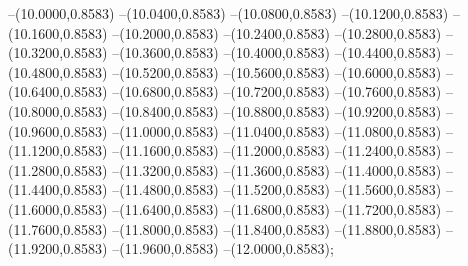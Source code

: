 {	--(10.0000,0.8583)
	--(10.0400,0.8583)
	--(10.0800,0.8583)
	--(10.1200,0.8583)
	--(10.1600,0.8583)
	--(10.2000,0.8583)
	--(10.2400,0.8583)
	--(10.2800,0.8583)
	--(10.3200,0.8583)
	--(10.3600,0.8583)
	--(10.4000,0.8583)
	--(10.4400,0.8583)
	--(10.4800,0.8583)
	--(10.5200,0.8583)
	--(10.5600,0.8583)
	--(10.6000,0.8583)
	--(10.6400,0.8583)
	--(10.6800,0.8583)
	--(10.7200,0.8583)
	--(10.7600,0.8583)
	--(10.8000,0.8583)
	--(10.8400,0.8583)
	--(10.8800,0.8583)
	--(10.9200,0.8583)
	--(10.9600,0.8583)
	--(11.0000,0.8583)
	--(11.0400,0.8583)
	--(11.0800,0.8583)
	--(11.1200,0.8583)
	--(11.1600,0.8583)
	--(11.2000,0.8583)
	--(11.2400,0.8583)
	--(11.2800,0.8583)
	--(11.3200,0.8583)
	--(11.3600,0.8583)
	--(11.4000,0.8583)
	--(11.4400,0.8583)
	--(11.4800,0.8583)
	--(11.5200,0.8583)
	--(11.5600,0.8583)
	--(11.6000,0.8583)
	--(11.6400,0.8583)
	--(11.6800,0.8583)
	--(11.7200,0.8583)
	--(11.7600,0.8583)
	--(11.8000,0.8583)
	--(11.8400,0.8583)
	--(11.8800,0.8583)
	--(11.9200,0.8583)
	--(11.9600,0.8583)
	--(12.0000,0.8583);
}
